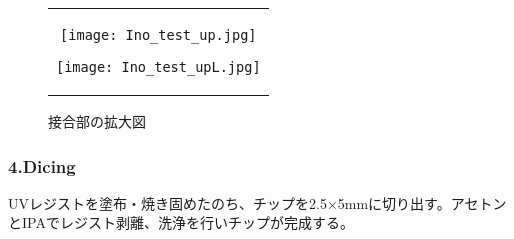 \begin{figure}[H]
    \begin{center}
        \begin{tabular}{c}
            \begin{minipage}{0.5\hsize}
                \begin{center}
                    \texttt{[image: Ino\_test\_up.jpg]}
                \end{center}
                \caption{2角度蒸着法で形成されたジョセフソン接合}
            \end{minipage}
            
            \begin{minipage}{0.5\hsize}
                \begin{center}
                    \texttt{[image: Ino\_test\_upL.jpg]}
                \end{center}
                \caption{接合部の拡大図}
            \end{minipage}
        \end{tabular}
    \end{center}
\end{figure}
\subsubsection{4.Dicing}
UVレジストを塗布・焼き固めたのち、チップを2.5×5mmに切り出す。アセトンとIPAでレジスト剥離、洗浄を行いチップが完成する。

